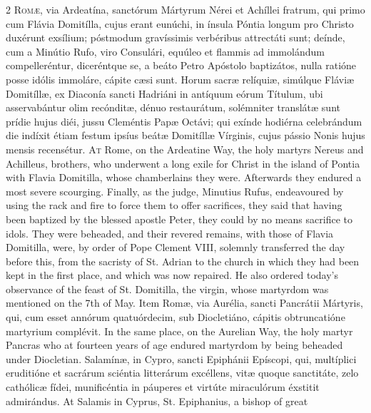 \begin{paracol}{2}
\lettrine[lines=2]{R}{omæ,} via Ardeatína, sanctórum Mártyrum Nérei et Achíllei 
 fratrum, qui primo cum Flávia Domitílla, cujus erant eunúchi, in ínsula 
 Póntia longum pro Christo duxérunt exsílium; póstmodum gravíssimis 
 verbéribus attrectáti sunt; deínde, cum a Minútio Rufo, viro Consulári, 
 equúleo et flammis ad immolándum compelleréntur, diceréntque se, a beáto 
 Petro Apóstolo baptizátos, nulla ratióne posse idólis immoláre, cápite cæsi 
 sunt. Horum sacræ relíquiæ, simúlque Fláviæ Domitíllæ, ex Diaconía 
 sancti Hadriáni in antíquum eórum Títulum, ubi asservabántur olim recónditæ, 
 dénuo restaurátum, solémniter translátæ sunt prídie hujus diéi, jussu 
 Cleméntis Papæ Octávi; qui exínde hodiérna celebrándum die indíxit étiam 
 festum ipsíus beátæ Domitíllæ Vírginis, cujus pássio Nonis hujus mensis 
 recensétur.
\switchcolumn
{}
\lettrine[lines=2]{A}{t} Rome, on the Ardeatine Way, the holy martyrs Nereus 
 and Achilleus, brothers, who underwent a long exile for Christ in the island 
 of Pontia with Flavia Domitilla, whose chamberlains they were. 
 Afterwards they endured a most severe scourging. Finally, as the 
 judge, Minutius Rufus, endeavoured by using the rack and fire to force them 
 to offer sacrifices, they said that having been baptized by the blessed 
 apostle Peter, they could by no means sacrifice to idols. They were 
 beheaded, and their revered remains, with those of Flavia Domitilla, were, 
 by order of Pope Clement VIII, solemnly transferred the day before this, 
 from the sacristy of St. Adrian to the church in which they had been kept in 
 the first place, and which was now repaired. He also ordered today's 
 observance of the feast of St. Domitilla, the virgin, whose martyrdom was 
 mentioned on the 7th of May.
\switchcolumn*
{}
Item Romæ, via Aurélia, sancti Pancrátii Mártyris, qui, 
 cum esset annórum quatuórdecim, sub Diocletiáno, cápitis obtruncatióne 
 martyrium complévit.
\switchcolumn
{}
In the same place, on the Aurelian Way, the holy martyr 
 Pancras who at fourteen years of age endured martyrdom by being beheaded 
 under Diocletian.
\switchcolumn*
{}
Salamínæ, in Cypro, sancti Epiphánii Epíscopi, qui, 
 multíplici eruditióne et sacrárum sciéntia litterárum excéllens, vitæ quoque 
 sanctitáte, zelo cathólicæ fídei, munificéntia in páuperes et virtúte 
 miraculórum éxstitit admirándus.
\switchcolumn
{}
At Salamis in Cyprus, St. Epiphanius, a bishop of great 

\end{paracol}
